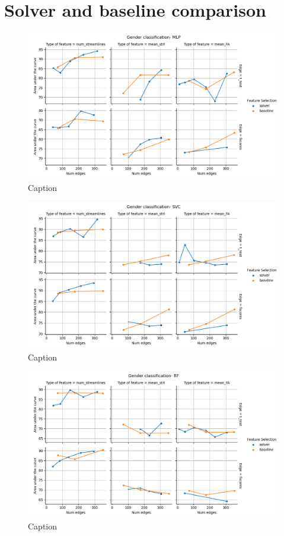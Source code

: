 \documentclass[msthesis.tex]{subfiles}
\begin{document}
\section{Solver and baseline comparison}
\begin{figure}
    \centering
    \includegraphics[width = \textwidth]{images/comparison_roc_auc_MLP.png}
    \caption{Caption}
    \label{fig:mlpgender}
\end{figure}
\begin{figure}
    \centering
    \includegraphics[width = \textwidth]{images/comparison_roc_auc_SVC.png}
    \caption{Caption}
    \label{fig:svcgender}
\end{figure}

\begin{figure}
    \centering
    \includegraphics[width = \textwidth]{images/comparison_roc_auc_RF.png}
    \caption{Caption}
    \label{fig:rfgender}
\end{figure}
\end{document}
